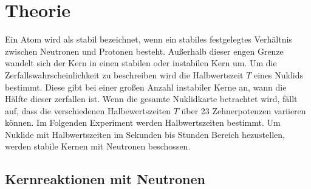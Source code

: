 \section{Theorie}
\label{sec:theorie}

Ein Atom wird als stabil bezeichnet, wenn ein stabiles festgelegtes Verhältnis zwischen Neutronen und Protonen besteht.
Außerhalb dieser engen Grenze wandelt sich der Kern in einen stabilen oder instabilen Kern um.
Um die Zerfallswahrscheinlichkeit zu beschreiben wird die Halbwertszeit $T$ eines Nuklids bestimmt. Diese gibt bei einer 
großen Anzahl instabiler Kerne an, wann die Hälfte dieser zerfallen ist. Wenn die gesamte Nuklidkarte betrachtet wird, fällt auf, dass 
die verschiedenen Halbewertszeiten $T$ über 23 Zehnerpotenzen variieren können.
Im Folgenden Experiment werden Halbwertszeiten bestimmt. Um Nuklide mit Halbwertszeiten im Sekunden bis Stunden Bereich hezustellen,
werden stabile Kernen mit Neutronen beschossen.

\subsection{Kernreaktionen mit Neutronen}
\label{sec:Kernreaktionen mit Neutronen}

